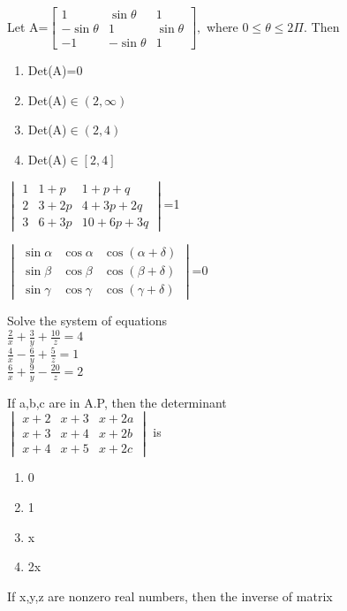 \item Let 
A=$\begin{bmatrix}
1&\sin\theta&1 \\ -\sin\theta&1&\sin\theta \\ -1&-\sin\theta&1
\end{bmatrix},$ 
where $0\leq \theta \leq 2\Pi.$ Then
\begin{enumerate}
\item Det(A)=0
\item Det(A)$\in(2,\infty)$
\item Det(A)$\in (2,4)$
\item Det(A)$\in [2,4]$
\end{enumerate}
\item $\begin{vmatrix}
1&1+p&1+p+q \\ 2&3+2p&4+3p+2q \\ 3&6+3p&10+6p+3q
\end{vmatrix}$=1\\
\item $\begin{vmatrix}\sin\alpha&\cos\alpha&\cos(\alpha+\delta) \\ \sin\beta&\cos\beta&\cos(\beta+\delta) \\ \sin\gamma&\cos\gamma&\cos(\gamma+\delta)\end{vmatrix}$=0\\
\item Solve the system of equations \\$\frac{2}{x}+\frac{3}{y}+\frac{10}{z}=4$\\$\frac{4}{x}-\frac{6}{y}+\frac{5}{z}=1$\\$\frac{6}{x}+\frac{9}{y}-\frac{20}{z}=2$\\
\item If a,b,c are in A.P, then the determinant\\
 $\begin{vmatrix}
x+2&x+3&x+2a \\ x+3&x+4&x+2b \\x+4&x+5&x+2c
\end{vmatrix}$ is 
\begin{enumerate}
\item 0
\item 1
\item x
\item 2x
\end{enumerate}
\item If x,y,z are nonzero real numbers, then the inverse of matrix 
